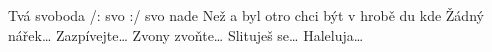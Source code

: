 \begin{TEXT}{Tvá svoboda}
\SLOKA /:  svo :/  svo nade   
\REFREN  Než a byl otro \NL
chci být  v hrobě  \NL
{}du  kde     
\SLOKA Žádný nářek… 
\SLOKA Zazpívejte… 
\SLOKA Zvony zvoňte… 
\SLOKA Slituješ se… 
\SLOKA Haleluja…
\end{TEXT}
